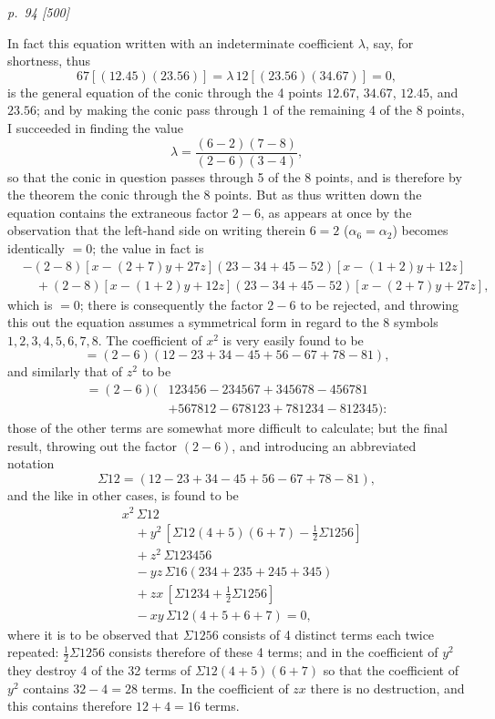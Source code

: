 \documentclass[11pt,a4paper]{article}
\newcommand{\sourcepage}[2]{%
  \bigskip
  \noindent\textit{p.~#1 [#2]}%
  \par\smallskip
}
\begin{document}
\sourcepage{94}{500}
In fact this equation written with an indeterminate coefficient $\lambda$, say, for
shortness, thus
\[
67[(12.45)(23.56)]=\lambda\,12[(23.56)(34.67)]=0,
\]
is the general equation of the conic through the 4 points $12.67$, $34.67$,
$12.45$, and $23.56$; and by making the conic pass through 1 of the remaining
4 of the 8 points, I succeeded in finding the value
\[
\lambda=\frac{(6-2)(7-8)}{(2-6)(3-4)},
\]
so that the conic in question passes through 5 of the 8 points, and is therefore
by the theorem the conic through the 8 points. But as thus written down the
equation contains the extraneous factor $2-6$, as appears at once by the observation
that the left-hand side on writing therein $6=2$ ($\alpha_6=\alpha_2$) becomes
identically $=0$; the value in fact is
\[
\begin{aligned}
&-(2-8)[x-(2+7)y+27z](23-34+45-52)[x-(1+2)y+12z]\\
&\quad+(2-8)[x-(1+2)y+12z](23-34+45-52)[x-(2+7)y+27z],
\end{aligned}
\]
which is $=0$; there is consequently the factor $2-6$ to be rejected, and throwing
this out the equation assumes a symmetrical form in regard to the 8 symbols
$1,2,3,4,5,6,7,8$. The coefficient of $x^2$ is very easily found to be
\[
=(2-6)(12-23+34-45+56-67+78-81),
\]
and similarly that of $z^2$ to be
\[
\begin{aligned}
=(2-6)(&123456-234567+345678-456781\\
&+567812-678123+781234-812345):
\end{aligned}
\]
those of the other terms are somewhat more difficult to calculate; but the final
result, throwing out the factor $(2-6)$, and introducing an abbreviated notation
\[
\Sigma12=(12-23+34-45+56-67+78-81),
\]
and the like in other cases, is found to be
\[
\begin{aligned}
&x^2\,\Sigma12\\
&\quad+y^2\,[\Sigma12(4+5)(6+7)-\tfrac12\Sigma1256]\\
&\quad+z^2\,\Sigma123456\\
&\quad-yz\,\Sigma16(234+235+245+345)\\
&\quad+zx\,[\Sigma1234+\tfrac12\Sigma1256]\\
&\quad-xy\,\Sigma12(4+5+6+7)=0,
\end{aligned}
\]
where it is to be observed that $\Sigma1256$ consists of 4 distinct terms each
twice repeated: $\tfrac12\Sigma1256$ consists therefore of these 4 terms; and in
the coefficient of $y^2$ they destroy 4 of the 32 terms of
$\Sigma12(4+5)(6+7)$ so that the coefficient of $y^2$ contains $32-4=28$ terms.
In the coefficient of $zx$ there is no destruction, and this contains therefore
$12+4=16$ terms.
\end{document}
